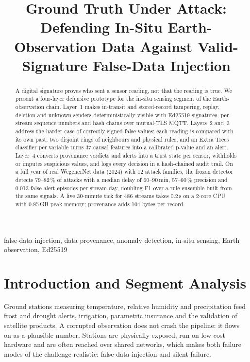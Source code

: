 \documentclass[conference]{IEEEtran}
\begin{document}
\title{Ground Truth Under Attack: Defending In-Situ Earth-Observation Data Against Valid-Signature False-Data Injection}

\author{
}

\maketitle

\begin{abstract}
A digital signature proves who sent a sensor reading, not that the reading is true. We present a four-layer
defensive prototype for the in-situ sensing segment of the Earth-observation chain. Layer~1 makes in-transit
and stored-record tampering, replay, deletion and unknown senders deterministically visible with Ed25519
signatures, per-stream sequence numbers and hash chains over mutual-TLS MQTT. Layers~2 and~3 address the
harder case of correctly signed false values: each reading is compared with its own past, two disjoint rings
of neighbours and physical rules, and an Extra Trees classifier per variable turns 37 causal features into a
calibrated p-value and an alert. Layer~4 converts provenance verdicts and alerts into a trust state per
sensor, withholds or imputes suspicious values, and logs every decision in a hash-chained audit trail. On a
full year of real WegenerNet data (2024) with 12 attack families, the frozen detector detects 79--82\,\% of
attacks with a median delay of 60--90\,min, 57--60\,\% precision and 0.013 false-alert episodes per
stream-day, doubling F1 over a rule ensemble built from the same signals. A live 30-minute tick for 486
streams takes 0.2\,s on a 2-core CPU with 0.85\,GB peak memory; provenance adds 104 bytes per record.
\end{abstract}

\begin{IEEEkeywords}
false-data injection, data provenance, anomaly detection, in-situ sensing, Earth observation, Ed25519
\end{IEEEkeywords}

\section{Introduction and Segment Analysis}

Ground stations measuring temperature, relative humidity and precipitation feed frost and drought alerts,
irrigation, parametric insurance and the validation of satellite products. A corrupted observation does not
crash the pipeline: it flows on as a plausible number. Stations are physically exposed, run on low-cost
hardware and are often reached over shared networks, which makes both failure modes of the challenge
realistic: false-data injection and silent failure.
\end{document}
